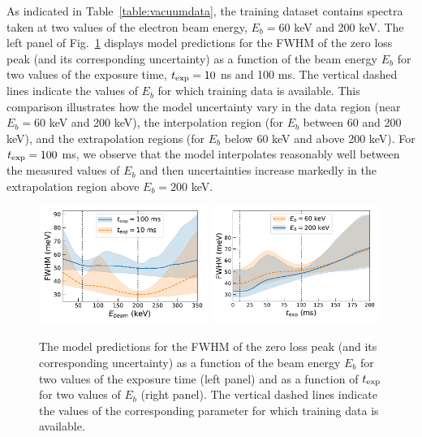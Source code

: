 As indicated in Table~\ref{table:vacuumdata}, the training dataset contains
spectra taken at two values of the electron beam energy, $E_b=60$ keV and 200 keV.
%
The left panel of Fig.~\ref{fig:extrapolbeam} displays  model predictions for the FWHM of the zero loss peak
      (and its corresponding uncertainty) as a function of the beam energy $E_b$
      for two values of the exposure time, $t_{\rm exp}=10$ ns and 100 ms.
      The vertical dashed lines indicate the values of $E_b$ for which training data is available.
      This comparison illustrates how the model uncertainty vary in the data region
      (near $E_b=60$ keV and 200 keV), the interpolation region (for $E_b$ between 60 and 200 keV),
      and the extrapolation regions (for $E_b$ below 60 keV and above 200 keV).
      For $t_{\rm exp}=100$ ms, we observe that the model interpolates reasonably well
      between the measured values of $E_b$ and then uncertainties increase
      markedly in the extrapolation region above $E_b=200$ keV.
      
\begin{figure}[t]
    \centering
    \includegraphics[width=0.49\textwidth]{plots/Ebeam_extrapolation.pdf}
    \includegraphics[width=0.49\textwidth]{plots/time_extrapolation.pdf}
    \caption{The model predictions for the FWHM of the zero loss peak
      (and its corresponding uncertainty) as a function of the beam energy $E_b$
      for two values of the exposure time (left panel)
      and as a function of $t_{\rm exp}$ for two values of $E_b$ (right panel).
      The vertical dashed lines indicate the values of the
      corresponding parameter for which training data is available.
    }
    \label{fig:extrapolbeam}
\end{figure}

